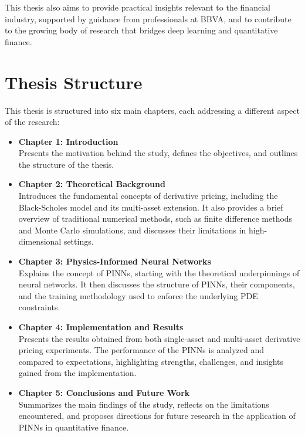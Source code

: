 \documentclass[12pt]{report} %
\theoremstyle{plain}           %
\theoremstyle{definition}      %
\theoremstyle{remark}          %
\begin{document}
This thesis also aims to provide practical insights relevant to the financial industry, supported by 
guidance from professionals at BBVA, and to contribute to the growing body of research that bridges 
deep learning and quantitative finance.

\section{Thesis Structure}
This thesis is structured into six main chapters, each addressing a different aspect of the research:
\begin{itemize}
    \item \textbf{Chapter 1: Introduction} \\
    Presents the motivation behind the study, defines the objectives, and outlines the structure of the 
	thesis.
    
    \item \textbf{Chapter 2: Theoretical Background} \\
    Introduces the fundamental concepts of derivative pricing, including the Black-Scholes model and 
	its multi-asset extension. It also provides a brief overview of traditional numerical methods, such 
	as finite difference methods and Monte Carlo simulations, and discusses their limitations in 
	high-dimensional settings.
    
    \item \textbf{Chapter 3: Physics-Informed Neural Networks} \\
    Explains the concept of PINNs, starting with the theoretical underpinnings of neural networks. It 
	then discusses the structure of PINNs, their components, and the training methodology used to enforce 
	the underlying PDE constraints.
    
    
    \item \textbf{Chapter 4: Implementation and Results} \\
    Presents the results obtained from both single-asset and multi-asset derivative pricing experiments. 
	The performance of the PINNs is analyzed and compared to expectations, highlighting strengths, 
	challenges, and insights gained from the implementation.
    
    \item \textbf{Chapter 5: Conclusions and Future Work} \\
    Summarizes the main findings of the study, reflects on the limitations encountered, and proposes 
	directions for future research in the application of PINNs in quantitative finance.
\end{itemize}
\end{document}
